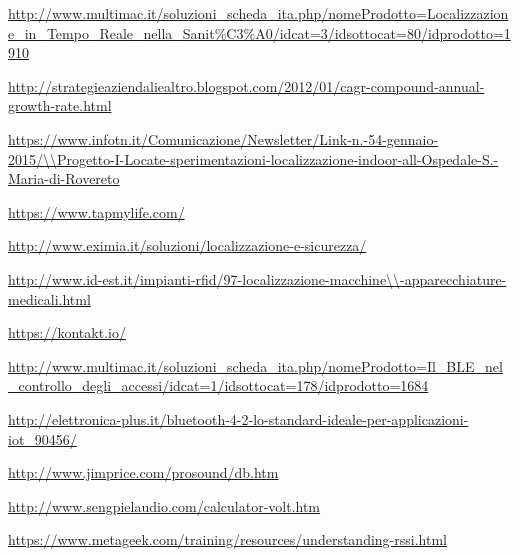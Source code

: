 \begin{thebibliography}{99}

\url{http://www.multimac.it/soluzioni_scheda_ita.php/nomeProdotto=Localizzazione_in_Tempo_Reale_nella_Sanit\%C3\%A0/idcat=3/idsottocat=80/idprodotto=1910}

\url{http://strategieaziendaliealtro.blogspot.com/2012/01/cagr-compound-annual-growth-rate.html}

\url{https://www.infotn.it/Comunicazione/Newsletter/Link-n.-54-gennaio-2015/\\Progetto-I-Locate-sperimentazioni-localizzazione-indoor-all-Ospedale-S.-Maria-di-Rovereto}

\url{https://www.tapmylife.com/}

\url{http://www.eximia.it/soluzioni/localizzazione-e-sicurezza/}

\url{http://www.id-est.it/impianti-rfid/97-localizzazione-macchine\\-apparecchiature-medicali.html}

\url{https://kontakt.io/}

\url{http://www.multimac.it/soluzioni_scheda_ita.php/nomeProdotto=Il_BLE_nel_controllo_degli_accessi/idcat=1/idsottocat=178/idprodotto=1684}

\url{http://elettronica-plus.it/bluetooth-4-2-lo-standard-ideale-per-applicazioni-iot_90456/}

\url{http://www.jimprice.com/prosound/db.htm}

\url{http://www.sengpielaudio.com/calculator-volt.htm}

\url{https://www.metageek.com/training/resources/understanding-rssi.html}

\end{thebibliography}




